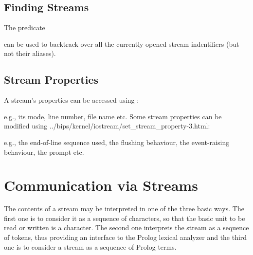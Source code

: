 \subsection{Finding Streams}
The predicate
\begin{quote}
\end{quote}
can be used to backtrack over all the currently opened stream
indentifiers (but not their aliases).


\subsection{Stream Properties}
A stream's properties can be accessed using
:
\begin{quote}
\end{quote}
e.g., its mode, line number, file name etc.
Some stream properties can be modified using
%
{../bips/kernel/iostream/set_stream_property-3.html}:
\begin{quote}
\end{quote}
e.g., the end-of-line sequence used, the flushing behaviour, the event-raising
behaviour, the prompt etc.


\section{Communication via Streams}
The contents of a stream may be interpreted in one of the
three basic ways.
The first one is to
consider it as a sequence of characters, so that the basic unit to
be read or written is a character. The second one interprets
the stream as a sequence of tokens, thus providing an interface
to the Prolog lexical analyzer and the third one is to consider a stream as
a sequence of Prolog terms.

